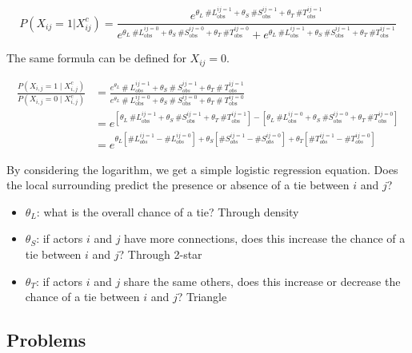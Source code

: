 \documentclass[
  notitlepage,
  onecolumn,
  openany]{book}
\providecommand{\tightlist}{%
  \setlength{\itemsep}{0pt}\setlength{\parskip}{0pt}}
\begin{document}
\[
P(X_{ij}=1|X_{ij}^c) = 
\frac{e^{\theta_{L}\ \# L_{\text {obs}}^{ij=1}+\theta_{S} \ \# S_{\text {obs}}^{ij=1}+\theta_{T}\ \# T_{\text {obs}}^{ij=1}}}
{e^{\theta_{L}\ \# L_{\text {obs}}^{ij=0}+\theta_{S} \ \# S_{\text {obs}}^{ij=0}+\theta_{T}\ \# T_{\text {obs}}^{ij=0}}+
e^{\theta_{L}\ \# L_{\text {obs}}^{ij=1}+\theta_{S} \ \# S_{\text {obs}}^{ij=1}+\theta_{T}\ \# T_{\text {obs}}^{ij=1}}}
\]

The same formula can be defined for \(X_{ij} = 0\).

\[
\begin{aligned}
\frac{{P}\left({X}_{i,j}=1 \mid {X}_{i,j}^{{c}}\right)}{{P}\left({X}_{i,j}=0 \mid {X}_{i,j}^{{c}}\right)} &= \frac{{e}^{\theta_{{L}}} \ \# {~L}_{{obs}}^{{ij}=1}+\theta_{{S}} \ \# {~S}_{{obs}}^{{ij}=1}+\theta_{T} \ \# {~T}_{{obs}}^{{ij}=1}}{e^{\theta_{{L}}} \ \# {~L}_{\text {obs }}^{{ij}=0}+\theta_{{S}} \ \# {~S}_{\text {obs}}^{{ij}=0}+\theta_{T} \ \# {~T}_{\text {obs}}^{{ij}=0}} \\
&= e^{\left[\theta_{L} \ \# L_{\text {obs }}^{i j=1}+\theta_{S} \ \# S_{\text {obs }}^{i j=1}+\theta_{T} \ \# T_{\text {obs }}^{i j=1}\right]-\left[\theta_{L}\ \# L_{\text {obs}}^{i j=0}+\theta_{S} \ \# S_{\text {obs}}^{i j=0}+\theta_{T} \ \# T_{\text {obs }}^{i j=0}\right]} \\
&= e^{\theta_L\left[\#L_{obs}^{ij=1}- \#L_{obs}^{ij=0}\right]+
\theta_S\left[\#S_{obs}^{ij=1}- \#S_{obs}^{ij=0}\right]+
\theta_T\left[\#T_{obs}^{ij=1}- \#T_{obs}^{ij=0}\right]}
\end{aligned}
\]

By considering the logarithm, we get a simple logistic regression equation. Does the local surrounding predict the presence or absence of a tie between \(i\) and \(j\)?

\begin{itemize}
\tightlist
\item
  \(\theta_L\): what is the overall chance of a tie? Through density
\item
  \(\theta_S\): if actors \(i\) and \(j\) have more connections, does this increase the chance of a tie between \(i\) and \(j\)? Through 2-star
\item
  \(\theta_T\): if actors \(i\) and \(j\) share the same others, does this increase or decrease the chance of a tie between \(i\) and \(j\)? Triangle
\end{itemize}

\hypertarget{problems}{%
\subsection{Problems}\label{problems}}
\end{document}
